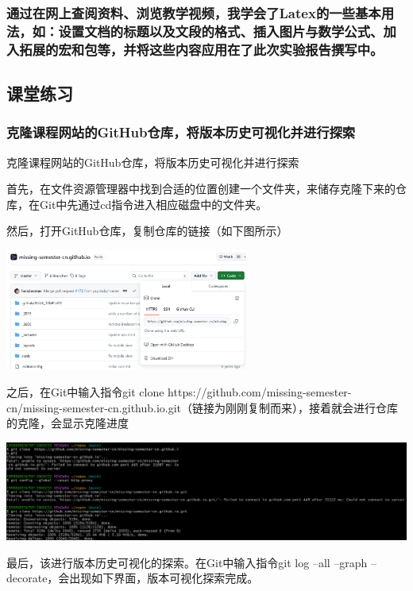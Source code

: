 \documentclass[UTF8,a4paper]{ctexart}
\begin{document}
\begin{sloppypar}
	\subsubsection{通过在网上查阅资料、浏览教学视频，我学会了Latex的一些基本用法，如：设置文档的标题以及文段的格式、插入图片与数学公式、加入拓展的宏和包等，并将这些内容应用在了此次实验报告撰写中。}
	\subsection{课堂练习}
	\subsubsection{克隆课程网站的GitHub仓库，将版本历史可视化并进行探索}
	
	
	克隆课程网站的GitHub仓库，将版本历史可视化并进行探索
	
	首先，在文件资源管理器中找到合适的位置创建一个文件夹，来储存克隆下来的仓库，在Git中先通过cd指令进入相应磁盘中的文件夹。
	
	然后，打开GitHub仓库，复制仓库的链接（如下图所示）
	
	\graphicspath{{picture/}}
	\includegraphics[width = 8cm]{1}
	
	之后，在Git中输入指令git clone https://github.com/missing-semester-cn/missing-semester-cn.github.io.git（链接为刚刚复制而来），接着就会进行仓库的克隆，会显示克隆进度
	
	\includegraphics[width = 16cm]{2}
	
	最后，该进行版本历史可视化的探索。在Git中输入指令git log --all --graph --decorate，会出现如下界面，版本可视化探索完成。
	

\end{sloppypar}
\end{document}
